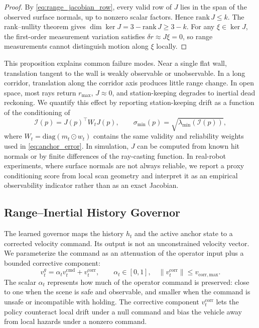 \documentclass[11pt]{article}
\begin{document}
\begin{proof}
By \eqref{eq:range_jacobian_row}, every valid row of $J$ lies in the span of
the observed surface normals, up to nonzero scalar factors. Hence
$\mathrm{rank}\,J \leq k$. The rank--nullity theorem gives
$\dim\ker J = 3-\mathrm{rank}\,J \geq 3-k$. For any $\xi \in \ker J$, the
first-order measurement variation satisfies $\delta r \approx J\xi =0$, so range
measurements cannot distinguish motion along $\xi$ locally.
\end{proof}

This proposition explains common failure modes. Near a single flat wall,
translation tangent to the wall is weakly observable or unobservable. In a long
corridor, translation along the corridor axis produces little range change. In
open space, most rays return $r_{\max}$, $J\approx 0$, and station-keeping
degrades to inertial dead reckoning. We quantify this effect by reporting
station-keeping drift as a function of the conditioning of
\begin{equation}
    \mathcal{I}(p) = J(p)^\top W_t J(p),
    \qquad
    \sigma_{\min}(p) = \sqrt{\lambda_{\min}(\mathcal{I}(p))},
    \label{eq:information_matrix}
\end{equation}
where $W_t=\mathrm{diag}(m_t\odot w_t)$ contains the same validity and
reliability weights used in \eqref{eq:anchor_error}. In simulation, $J$ can be
computed from known hit normals or by finite differences of the ray-casting
function. In real-robot experiments, where surface normals are not always
reliable, we report a proxy conditioning score from local scan geometry and
interpret it as an empirical observability indicator rather than as an exact
Jacobian.

\subsection{Range--Inertial History Governor}
\label{sec:governor}

The learned governor maps the history $h_t$ and the active anchor state to a
corrected velocity command. Its output is not an unconstrained velocity vector.
We parameterize the command as an attenuation of the operator input plus a
bounded corrective component:
\begin{equation}
    v^{g}_t
    = \alpha_t v^{\mathrm{cmd}}_t + v^{\mathrm{corr}}_t,
    \qquad
    \alpha_t \in [0,1], \quad
    \|v^{\mathrm{corr}}_t\| \leq v_{\mathrm{corr,max}}.
    \label{eq:governor_output}
\end{equation}
The scalar $\alpha_t$ represents how much of the operator command is preserved:
close to one when the scene is safe and observable, and smaller when the command
is unsafe or incompatible with holding. The corrective component
$v^{\mathrm{corr}}_t$ lets the policy counteract local drift under a null command
and bias the vehicle away from local hazards under a nonzero command.
\end{document}
